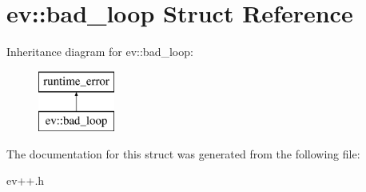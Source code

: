 \hypertarget{structev_1_1bad__loop}{}\section{ev\+:\+:bad\+\_\+loop Struct Reference}
\label{structev_1_1bad__loop}
Inheritance diagram for ev\+:\+:bad\+\_\+loop\+:\begin{figure}[H]
\begin{center}
\leavevmode
\includegraphics[height=2.000000cm]{structev_1_1bad__loop}
\end{center}
\end{figure}


The documentation for this struct was generated from the following file\+:\begin{DoxyCompactItemize}
\item 
ev++.\+h\end{DoxyCompactItemize}
